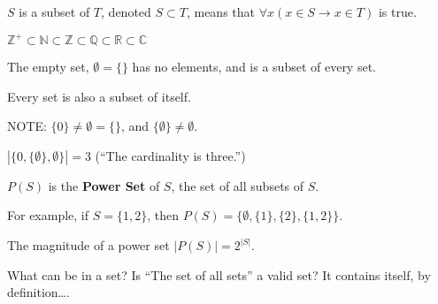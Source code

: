 \documentclass{article}
\theoremstyle{definition}
\begin{document}
$S$ is a subset of $T$, denoted $S \subset T$, means that 
$\forall x (x \in S \to x \in T)$ is true. 

$\mathbb{Z}^+ \subset \mathbb{N} \subset \mathbb{Z} \subset
\mathbb{Q} \subset \mathbb{R} \subset \mathbb{C}$

The empty set, $\emptyset = \{\}$ has no elements, and is a subset of every set.

Every set is also a subset of itself. 

NOTE: $\{0\} \neq \emptyset = \{\}$, and $\{\emptyset\} \neq \emptyset$.

$|\{0, \{\emptyset\}, \emptyset \}| = 3$ (``The cardinality is three.'')

$P(S)$ is the \textbf{Power Set} of $S$, the set of all subsets of $S$.

For example, if $S=\{1,2\}$, then $P(S)=\{\emptyset, \{1\}, \{2\}, \{1,2\}\}$.

The magnitude of a power set $|P(S)| = 2^{|S|}$.

What can be in a set? Is ``The set of all sets'' a valid set? It contains
itself, by definition\dots.
\end{document}
